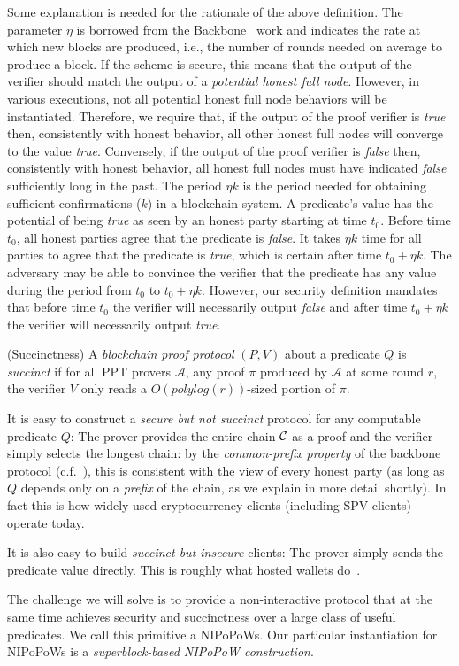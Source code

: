 Some explanation is needed for the rationale of the above definition. The
parameter $\eta$ is borrowed from the Backbone~\cite{backbone} work and
indicates the rate at which new blocks are produced, i.e., the number of rounds
needed on average to produce a block. If the scheme is secure, this means that
the output of the verifier should match the output of a \emph{potential honest
full node}. However, in various executions, not all potential honest full node
behaviors will be instantiated. Therefore, we require that, if the output of the
proof verifier is \emph{true} then, consistently with honest behavior, all other
honest full nodes will converge to the value \emph{true}. Conversely, if the
output of the proof verifier is \emph{false} then, consistently with honest
behavior, all honest full nodes must have indicated \emph{false} sufficiently
long in the past. The period $\eta k$ is the period needed for obtaining
sufficient confirmations ($k$) in a blockchain system. A predicate's value has
the potential of being \emph{true} as seen by an honest party starting at time
$t_0$. Before time $t_0$, all honest parties agree that the predicate is
\emph{false}. It takes $\eta k$ time for all parties to agree that the predicate
is \emph{true}, which is certain after time $t_0 + \eta k$. The adversary may be
able to convince the verifier that the predicate has any value during the period
from $t_0$ to $t_0 + \eta k$. However, our security definition mandates that
before time $t_0$ the verifier will necessarily output \emph{false} and after
time $t_0 + \eta k$ the verifier will necessarily output \emph{true}.

\begin{definition}{(Succinctness)}
A \emph{blockchain proof protocol} $(P, V)$ about a predicate $Q$ is
\emph{succinct} if for all PPT provers $\mathcal{A}$, any proof $\pi$ produced
by $\mathcal{A}$ at some round $r$, the verifier $V$ only reads a
$O(polylog(r))$-sized portion of $\pi$.
\end{definition}

It is easy to construct a \emph{secure but not succinct} protocol for any
computable predicate $Q$: The prover provides the entire chain $\mathcal{C}$ as a
proof and the verifier simply selects the longest chain: by the
\emph{common-prefix property} of the backbone protocol (c.f.~\cite{backbone}),
this is consistent with the view of every honest party (as long as $Q$ depends
only on a \emph{prefix} of the chain, as we explain in more detail shortly). In
fact this is how widely-used cryptocurrency clients (including SPV clients)
operate today.

It is also easy to build \emph{succinct but insecure} clients: The prover simply
sends the predicate value directly. This is roughly what hosted wallets
do~\cite{sok}.

The challenge we will solve is to provide a non-interactive protocol that at the
same time achieves security and succinctness over a large class of useful
predicates. We call this primitive a NIPoPoWs. Our particular instantiation for
NIPoPoWs is a \emph{superblock-based NIPoPoW construction}.
